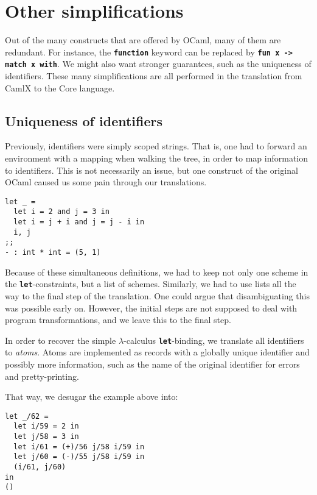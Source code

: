 \documentclass[10pt,a4paper,twoside,titlepage,twocolumn]{article}
\newcommand{\code}[1]{\textbf{\texttt{#1}}}
\begin{document}
\section{Other simplifications\label{desugar}}

Out of the many constructs that are offered by OCaml, many of them are
redundant. For instance, the \code{function} keyword can be replaced by
\code{fun x -> match x with}. We might also want stronger guarantees, such as
the uniqueness of identifiers. These many simplifications are all performed in the
translation from CamlX to the Core language.

\subsection{Uniqueness of identifiers}

Previously, identifiers were simply scoped strings. That is, one had to
forward an environment with a mapping when walking the tree, in order to map
information to identifiers. This is not necessarily an issue, but one construct
of the original OCaml caused us some pain through our translations.

\begin{verbatim}
let _ =
  let i = 2 and j = 3 in
  let i = j + i and j = j - i in
  i, j
;;
- : int * int = (5, 1)
\end{verbatim}

Because of these simultaneous definitions, we had to keep not only one scheme in
the \code{let}-constraints, but a list of schemes. Similarly, we had to use
lists all the way to the final step of the translation. One could argue that
disambiguating this was possible early on. However, the initial steps are not
supposed to deal with program transformations, and we leave this to the final
step.

In order to recover the simple $\lambda$-calculus \code{let}-binding, we
translate all identifiers to \emph{atoms}. Atoms are implemented as records with
a globally unique identifier and possibly more information, such as the name of
the original identifier for errors and pretty-printing.

That way, we desugar the example above into:

\begin{verbatim}
let _/62 =
  let i/59 = 2 in
  let j/58 = 3 in
  let i/61 = (+)/56 j/58 i/59 in
  let j/60 = (-)/55 j/58 i/59 in
  (i/61, j/60)
in
()
\end{verbatim}
\end{document}
